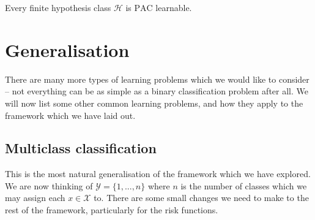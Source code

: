 \begin{proposition}
	Every finite hypothesis class $ \mathcal{H} $ is $ \mathrm{PAC} $ learnable.
\end{proposition}

\section{Generalisation}
There are many more types of learning problems which we would like to consider -- not everything can be as simple as a binary classification problem after all. We will now list some other common learning problems, and how they apply to the framework which we have laid out.

\subsection{Multiclass classification}
This is the most natural generalisation of the framework which we have explored. We are now thinking of $ \mathcal{Y} = \{ 1,..., n \} $ where $ n $ is the number of classes which we may assign each $ x \in \mathcal{X} $ to. There are some small changes we need to make to the rest of the framework, particularly for the risk functions.

